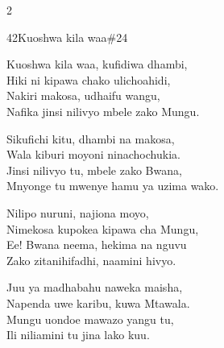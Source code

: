\documentclass{article}
\begin{document}
\begin{multicols}{2}
\begin{hymn}{42}{Kuoshwa kila waa}{\#24}
\begin{stanza}
Kuoshwa kila waa, kufidiwa dhambi,\\
Hiki ni kipawa chako ulichoahidi,\\
Nakiri makosa, udhaifu wangu,\\
Nafika jinsi nilivyo mbele zako Mungu.
\end{stanza}
\begin{stanza}
Sikufichi kitu, dhambi na makosa,\\
Wala kiburi moyoni ninachochukia.\\
Jinsi nilivyo tu, mbele zako Bwana,\\
Mnyonge tu mwenye hamu ya uzima wako.
\end{stanza}
\begin{stanza}
Nilipo nuruni, najiona moyo,\\
Nimekosa kupokea kipawa cha Mungu,\\
Ee! Bwana neema, hekima na nguvu\\
Zako zitanihifadhi, naamini hivyo.
\end{stanza}
\begin{stanza}
Juu ya madhabahu naweka maisha,\\
Napenda uwe karibu, kuwa Mtawala.\\
Mungu uondoe mawazo yangu tu,\\
Ili niliamini tu jina lako kuu.
\end{stanza}
\end{hymn}


\end{multicols}
\end{document}
